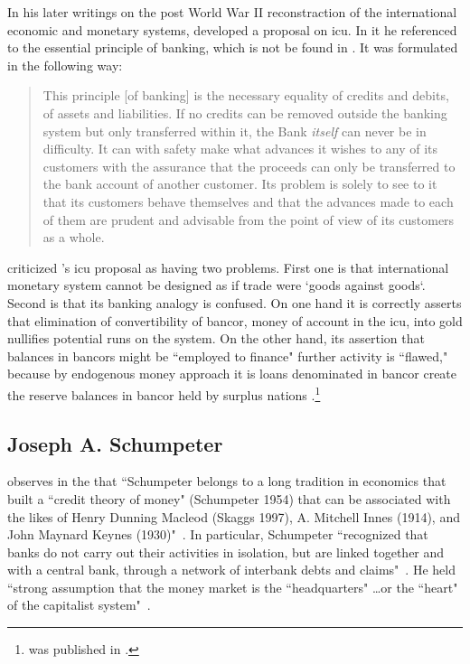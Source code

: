 In his later writings on the post World War II reconstraction of the international economic and monetary systems, \citeauthor{keynes1980_25} developed a proposal on \acf{icu}. In it he referenced to the essential principle of banking, which is not be found in \cite{innes1910,innes1913,innes1914}. It was formulated in the following way:

\begin{quote}
This principle [of banking] is the necessary equality of credits and debits, of assets and liabilities. If no credits can be removed outside the banking system but only transferred within it, the Bank \textit{itself} can never be in difficulty. It can with safety make what advances it wishes to any of its customers with the assurance that the proceeds can only be transferred to the bank account of another customer. Its problem is solely to see to it that its customers behave themselves and that the advances made to each of them are prudent and advisable from the point of view of its customers as a whole.~\citep[pp.~44-45]{keynes1980_25}
\end{quote}

\cite{wray1999} criticized \citeauthor{keynes1980_25}'s \ac{icu} proposal as having two problems. First one is that international monetary system cannot be designed as if trade were `goods against goods`. Second is that its banking analogy is confused. On one hand it is correctly asserts that elimination of convertibility of bancor, money of account in the \ac{icu}, into gold nullifies potential runs on the system. On the other hand, its assertion that balances in bancors might be ``employed to finance" further activity is ``flawed," because by endogenous money approach it is loans denominated in bancor create the reserve balances in bancor held by surplus nations \citep[p.~194-198, footnote 16]{wray1999}.\footnote{\cite{wray1999} was published in \cite{harvey1999}.}

%
%
\subsection{Joseph A. Schumpeter}

\citeauthor{lakomski} observes in the \citeyear{lakomski} that ``Schumpeter belongs to a long tradition in economics that built a ``credit theory of money" (Schumpeter 1954) that can be associated with the likes of Henry Dunning Macleod (Skaggs 1997), A. Mitchell Innes (1914), and John Maynard Keynes (1930)"~\citep[p.~503]{lakomski}. In particular, Schumpeter ``recognized that banks do not carry out their activities in isolation, but are linked together and with a central bank, through a network of interbank debts and claims"~\citep[p.~502]{lakomski}. He held ``strong assumption that the money market is the ``headquarters" \dots or the ``heart" of the capitalist system"~\citep[p.~507]{lakomski}.

